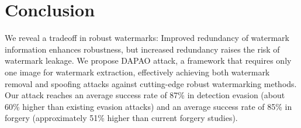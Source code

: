 \section{Conclusion}
We reveal a tradeoff in robust watermarks: Improved redundancy of watermark information enhances robustness, but increased redundancy raises the risk of watermark leakage. We propose DAPAO attack, a framework that requires only one image for watermark extraction, effectively achieving both watermark removal and spoofing attacks against cutting-edge robust watermarking methods. Our attack reaches an average success rate of 87\% in detection evasion (about 60\% higher than existing evasion attacks) and an average success rate of 85\% in forgery (approximately 51\% higher than current forgery studies). 